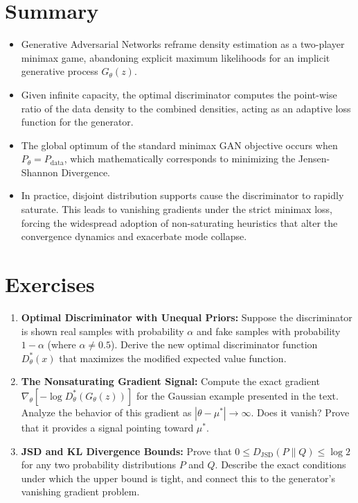 \section*{Summary}
\begin{itemize}
    \item Generative Adversarial Networks reframe density estimation as a two-player minimax game, abandoning explicit maximum likelihoods for an implicit generative process $G_\theta(z)$.
    \item Given infinite capacity, the optimal discriminator computes the point-wise ratio of the data density to the combined densities, acting as an adaptive loss function for the generator.
    \item The global optimum of the standard minimax GAN objective occurs when $P_\theta = P_{\text{data}}$, which mathematically corresponds to minimizing the Jensen-Shannon Divergence.
    \item In practice, disjoint distribution supports cause the discriminator to rapidly saturate. This leads to vanishing gradients under the strict minimax loss, forcing the widespread adoption of non-saturating heuristics that alter the convergence dynamics and exacerbate mode collapse.
\end{itemize}

\section*{Exercises}
\begin{enumerate}
    \item \textbf{Optimal Discriminator with Unequal Priors:} Suppose the discriminator is shown real samples with probability $\alpha$ and fake samples with probability $1-\alpha$ (where $\alpha \neq 0.5$). Derive the new optimal discriminator function $D^*_\theta(x)$ that maximizes the modified expected value function.
    \item \textbf{The Nonsaturating Gradient Signal:} Compute the exact gradient $\nabla_\theta [-\log D^*_\theta(G_\theta(z))]$ for the Gaussian example presented in the text. Analyze the behavior of this gradient as $|\theta - \mu^*| \to \infty$. Does it vanish? Prove that it provides a signal pointing toward $\mu^*$.
    \item \textbf{JSD and KL Divergence Bounds:} Prove that $0 \le D_{\text{JSD}}(P \parallel Q) \le \log 2$ for any two probability distributions $P$ and $Q$. Describe the exact conditions under which the upper bound is tight, and connect this to the generator's vanishing gradient problem.
\end{enumerate}

